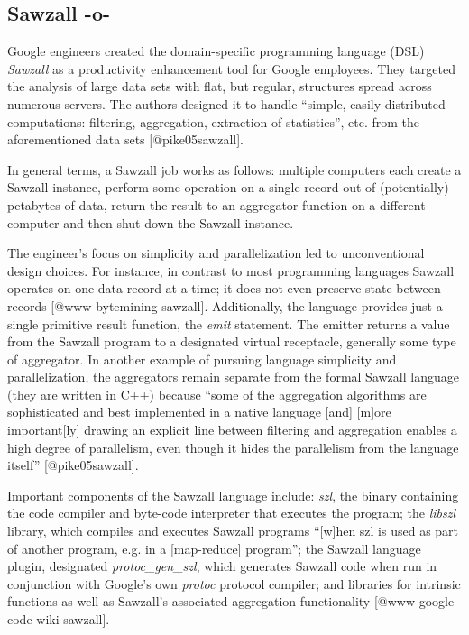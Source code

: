 \subsection{Sawzall -o-}

Google engineers created the domain-specific programming language
(DSL) \textit{Sawzall} as a productivity enhancement tool for Google
employees.  They targeted the analysis of large data sets with flat,
but regular, structures spread across numerous servers.  The authors
designed it to handle ``simple, easily distributed computations:
filtering, aggregation, extraction of statistics'', etc. from the
aforementioned data sets [@pike05sawzall].

In general terms, a Sawzall job works as follows: multiple computers
each create a Sawzall instance, perform some operation on a single
record out of (potentially) petabytes of data, return the result to an
aggregator function on a different computer and then shut down the
Sawzall instance.

The engineer's focus on simplicity and parallelization led to
unconventional design choices.  For instance, in contrast to most
programming languages Sawzall operates on one data record at a time;
it does not even preserve state between records
[@www-bytemining-sawzall]. Additionally, the language provides
just a single primitive result function, the \textit{emit} statement.
The emitter returns a value from the Sawzall program to a designated
virtual receptacle, generally some type of aggregator.  In another
example of pursuing language simplicity and parallelization, the
aggregators remain separate from the formal Sawzall language (they are
written in C++) because ``some of the aggregation algorithms are
sophisticated and best implemented in a native language [and] [m]ore
important[ly] drawing an explicit line between filtering and
aggregation enables a high degree of parallelism, even though it hides
the parallelism from the language itself'' [@pike05sawzall].

Important components of the Sawzall language include: \textit{szl},
the binary containing the code compiler and byte-code interpreter that
executes the program; the \textit{libszl} library, which compiles and
executes Sawzall programs ``[w]hen szl is used as part of another
program, e.g. in a [map-reduce] program''; the Sawzall language
plugin, designated \textit{protoc\_gen\_szl}, which generates Sawzall
code when run in conjunction with Google's own \textit{protoc}
protocol compiler; and libraries for intrinsic functions as well as
Sawzall's associated aggregation functionality
[@www-google-code-wiki-sawzall].



